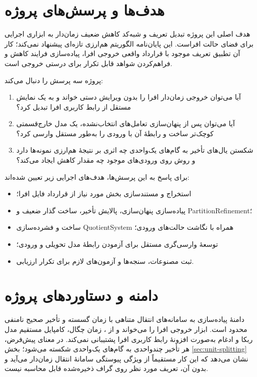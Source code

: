 \section{هدف‌ها و پرسش‌های پروژه}

هدف اصلی این پروژه تبدیل تعریف و شبه‌کد کاهش ضعیف زمان‌دار به ابزاری اجرایی برای فضای حالت افراست. این پایان‌نامه الگوریتم هم‌ارزی تازه‌ای پیشنهاد نمی‌کند؛ کار آن تطبیق تعریف موجود با قرارداد واقعی خروجی افرا، پیاده‌سازی فرایند کاهش و فراهم‌کردن شواهد قابل تکرار برای درستی خروجی است.

پروژه سه پرسش را دنبال می‌کند:

\begin{enumerate}
\item آیا می‌توان خروجی زمان‌دار افرا را بدون ویرایش دستی خواند و به یک نمایش مستقل از رابط کاربری افرا تبدیل کرد؟
\item آیا می‌توان پس از پنهان‌سازی تعامل‌های انتخاب‌نشده، یک مدل خارج‌قسمتی کوچک‌تر ساخت و رابطهٔ آن با ورودی را به‌طور مستقل وارسی کرد؟
\item شکستن یال‌های تأخیر به گام‌های یک‌واحدی چه اثری بر نتیجهٔ هم‌ارزی نمونه‌ها دارد و روش روی ورودی‌های موجود چه مقدار کاهش ایجاد می‌کند؟
\end{enumerate}

برای پاسخ به این پرسش‌ها، هدف‌های اجرایی زیر تعیین شده‌اند:

\begin{itemize}
\item استخراج و مستندسازی بخش مورد نیاز از قرارداد فایل  افرا؛
\item پیاده‌سازی پنهان‌سازی، پالایش تأخیر، ساخت گذار ضعیف و \gls{PartitionRefinement}؛
\item ساخت و فشرده‌سازی \gls{QuotientSystem} همراه با نگاشت حالت‌های ورودی؛
\item توسعهٔ وارسی‌گری مستقل برای آزمودن رابطهٔ مدل تحویلی و ورودی؛
\item ثبت مصنوعات، سنجه‌ها و آزمون‌های لازم برای تکرار ارزیابی.
\end{itemize}

\section{دامنه و دستاوردهای پروژه}

دامنهٔ پیاده‌سازی به سامانه‌های انتقال متناهی با زمان گسسته و تأخیر صحیح نامنفی محدود است. ابزار خروجی  افرا را می‌خواند و از ، زمان چگال، کامپایل مستقیم مدل ربکا و ادغام به‌صورت افزونهٔ رابط کاربری افرا پشتیبانی نمی‌کند. در معنای پیش‌فرض، هر تأخیر چندواحدی به گام‌های یک‌واحدی شکسته می‌شود؛ بخش \ref{sec:unit-splitting} نشان می‌دهد که این کار مستقیماً از ویژگی پیوستگی سامانهٔ انتقال زمان‌دار می‌آید و بدون آن، تعریف مورد نظر روی گراف ذخیره‌شده قابل محاسبه نیست.

